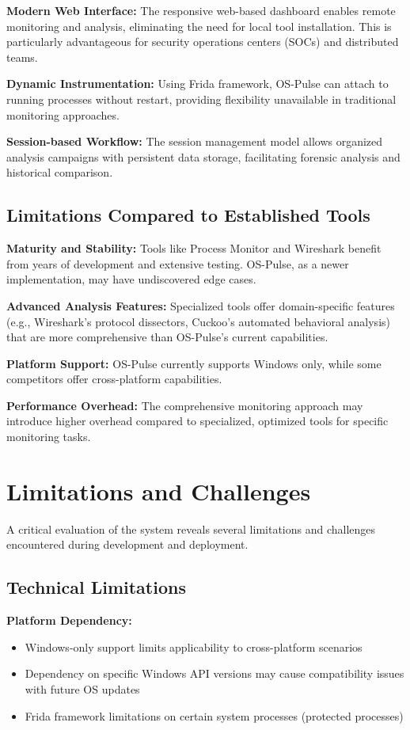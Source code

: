 \textbf{Modern Web Interface:}
The responsive web-based dashboard enables remote monitoring and analysis, eliminating the need for local tool installation. This is particularly advantageous for security operations centers (SOCs) and distributed teams.

\textbf{Dynamic Instrumentation:}
Using Frida framework, OS-Pulse can attach to running processes without restart, providing flexibility unavailable in traditional monitoring approaches.

\textbf{Session-based Workflow:}
The session management model allows organized analysis campaigns with persistent data storage, facilitating forensic analysis and historical comparison.

\subsection{Limitations Compared to Established Tools}

\textbf{Maturity and Stability:}
Tools like Process Monitor and Wireshark benefit from years of development and extensive testing. OS-Pulse, as a newer implementation, may have undiscovered edge cases.

\textbf{Advanced Analysis Features:}
Specialized tools offer domain-specific features (e.g., Wireshark's protocol dissectors, Cuckoo's automated behavioral analysis) that are more comprehensive than OS-Pulse's current capabilities.

\textbf{Platform Support:}
OS-Pulse currently supports Windows only, while some competitors offer cross-platform capabilities.

\textbf{Performance Overhead:}
The comprehensive monitoring approach may introduce higher overhead compared to specialized, optimized tools for specific monitoring tasks.

\section{Limitations and Challenges}

A critical evaluation of the system reveals several limitations and challenges encountered during development and deployment.

\subsection{Technical Limitations}

\textbf{Platform Dependency:}
\begin{itemize}
    \item Windows-only support limits applicability to cross-platform scenarios
    \item Dependency on specific Windows API versions may cause compatibility issues with future OS updates
    \item Frida framework limitations on certain system processes (protected processes)
\end{itemize}

